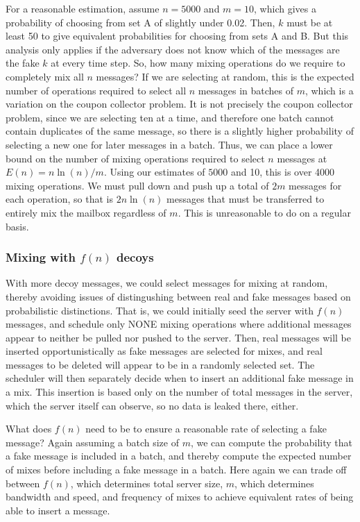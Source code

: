\documentclass[pageno]{jpaper}
\begin{document}
For a reasonable estimation, assume $n=5000$ and $m=10$, which gives a probability of choosing from set A of slightly under 0.02. Then, $k$ must be at least 50 to give equivalent probabilities for choosing from sets A and B. But this analysis only applies if the adversary does not know which of the messages are the fake $k$ at every time step. So, how many mixing operations do we require to completely mix all $n$ messages? If we are selecting at random, this is the expected number of operations required to select all $n$ messages in batches of $m$, which is a variation on the coupon collector problem. It is not precisely the coupon collector problem, since we are selecting ten at a time, and therefore one batch cannot contain duplicates of the same message, so there is a slightly higher probability of selecting a new one for later messages in a batch. Thus, we can place a lower bound on the number of mixing operations required to select $n$ messages at $E(n) = n \ln (n) / m$. Using our estimates of $5000$ and 10, this is over 4000 mixing operations. We must pull down and push up a total of $2m$ messages for each operation, so that is $2n\ln (n)$ messages that must be transferred to entirely mix the mailbox regardless of $m$. This is unreasonable to do on a regular basis.


\label{fofn}
\subsubsection{Mixing with \texorpdfstring{$f(n)$}{f(n)} decoys}
With more decoy messages, we could select messages for mixing at random, thereby avoiding issues of distingushing between real and fake messages based on probabilistic distinctions. That is, we could initially seed the server with $f(n)$ messages, and schedule only NONE mixing operations where additional messages appear to neither be pulled nor pushed to the server. Then, real messages will be inserted opportunistically as fake messages are selected for mixes, and real messages to be deleted will appear to be in a randomly selected set. The scheduler will then separately decide when to insert an additional fake message in a mix. This insertion is based only on the number of total messages in the server, which the server itself can observe, so no data is leaked there, either.

What does $f(n)$ need to be to ensure a reasonable rate of selecting a fake message? Again assuming a batch size of $m$, we can compute the probability that a fake message is included in a batch, and thereby compute the expected number of mixes before including a fake message in a batch. Here again we can trade off between $f(n)$, which determines total server size, $m$, which determines bandwidth and speed, and frequency of mixes to achieve equivalent rates of being able to insert a message.
\end{document}
